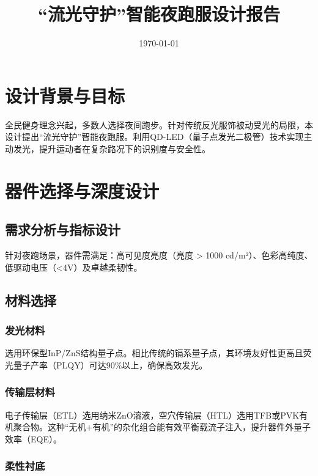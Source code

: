 \documentclass[12pt,a4paper]{ctexart}
\title{\textbf{``流光守护''智能夜跑服设计报告}}
\author{}
\date{\today}
\begin{document}
\maketitle
\thispagestyle{empty}

\vspace{1cm}

\section{设计背景与目标}

全民健身理念兴起，多数人选择夜间跑步。针对传统反光服饰被动受光的局限，本设计提出``流光守护''智能夜跑服。利用QD-LED（量子点发光二极管）技术实现主动发光，提升运动者在复杂路况下的识别度与安全性。

\section{器件选择与深度设计}

\subsection{需求分析与指标设计}

针对夜跑场景，器件需满足：高可见度亮度（亮度 > 1000 cd/m²）、色彩高纯度、低驱动电压（<4V）及卓越柔韧性。

\subsection{材料选择}

\subsubsection*{发光材料}

选用环保型InP/ZnS结构量子点。相比传统的镉系量子点，其环境友好性更高且荧光量子产率（PLQY）可达90\%以上，确保高效发光。

\subsubsection*{传输层材料}

电子传输层（ETL）选用纳米ZnO溶液，空穴传输层（HTL）选用TFB或PVK有机聚合物。这种``无机+有机''的杂化组合能有效平衡载流子注入，提升器件外量子效率（EQE）。

\subsubsection*{柔性衬底}
\end{document}
